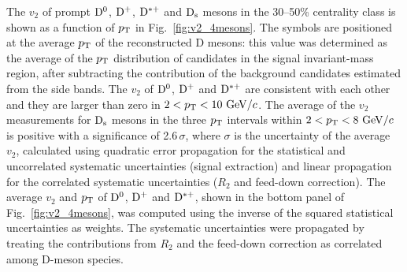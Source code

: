 \fi
The $v_2$ of prompt ${\rm D^0}$, ${\rm D^+}$, ${\rm D^{*+}}$ and ${\rm D_s}$ mesons in
the 30--50\% centrality class is shown as a function of $p_{\rm T}$ in Fig.~\ref{fig:v2_4mesons}.
The symbols are positioned at the average $p_{\rm T}$ of the 
reconstructed D mesons: this value was determined as the average of the $p_{\rm T}$ distribution of candidates in the signal invariant-mass region, 
after subtracting the contribution of the background candidates estimated from the side bands.
The $v_2$ of ${\rm D^0}$, ${\rm D^+}$ and ${\rm D^{*+}}$ are consistent with each other and they are larger than zero in $2<p_{\rm T}<10~\mathrm{GeV}/c$.
The average of the $v_2$ measurements for ${\rm D_s}$ mesons in the three $p_{\rm T}$ intervals within $2<p_{\rm T}<8~\mathrm{GeV}/c$ is positive with a significance of 2.6\,$\sigma$,
where $\sigma$ is the uncertainty of the average $v_2$, calculated using quadratic error propagation for the statistical and uncorrelated systematic uncertainties 
(signal extraction) and linear propagation for the correlated systematic uncertainties ($R_2$ and feed-down correction).
The average $v_2$ and $p_{\rm T}$ of ${\rm D^0}$, ${\rm D^+}$ and ${\rm D^{*+}}$, shown in the bottom panel of Fig.~\ref{fig:v2_4mesons}, was 
computed using the inverse of the squared statistical uncertainties as weights. 
The systematic uncertainties were propagated by
treating the contributions from $R_2$
and the feed-down correction as correlated among D-meson species. 
